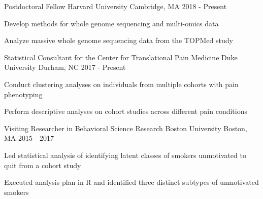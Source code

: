 

\begin{cventries}
\cventry
{Postdoctoral Fellow} %
{Harvard University} %
{Cambridge, MA} %
{2018 - Present} %
{
	\begin{cvitems} %
		\item {Develop methods for whole genome sequencing and multi-omics data}
		\item {Analyze massive whole genome sequencing data from the TOPMed study}
	\end{cvitems}
}


  \cventry
    {Statistical Consultant for the Center for Translational Pain Medicine} %
    {Duke University} %
    {Durham, NC} %
    {2017 - Present} %
    {
      \begin{cvitems} %
        \item {Conduct clustering analyses on individuals from multiple cohorts with pain phenotyping}
        \item {Perform descriptive analyses on cohort studies across different pain conditions}
      \end{cvitems}
    }

  \cventry
    {Visiting Researcher in Behavioral Science Research} %
    {Boston University} %
    {Boston, MA} %
    {2015 - 2017} %
    {
      \begin{cvitems} %
        \item {Led statistical analysis of identifying latent classes of smokers unmotivated to quit from a cohort study}
        \item {Executed analysis plan in R and identified three distinct subtypes of unmotivated smokers}
      \end{cvitems}
    }


\end{cventries}
